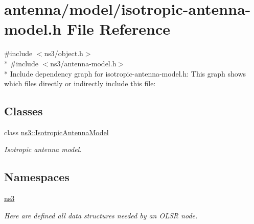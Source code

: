 \hypertarget{isotropic-antenna-model_8h}{}\section{antenna/model/isotropic-\/antenna-\/model.h File Reference}
\label{isotropic-antenna-model_8h}
{\ttfamily \#include $<$ns3/object.\+h$>$}\\*
{\ttfamily \#include $<$ns3/antenna-\/model.\+h$>$}\\*
Include dependency graph for isotropic-\/antenna-\/model.h\+:
This graph shows which files directly or indirectly include this file\+:
\subsection*{Classes}
\begin{DoxyCompactItemize}
\item 
class \hyperlink{classns3_1_1IsotropicAntennaModel}{ns3\+::\+Isotropic\+Antenna\+Model}
\begin{DoxyCompactList}\small\item\em Isotropic antenna model. \end{DoxyCompactList}\end{DoxyCompactItemize}
\subsection*{Namespaces}
\begin{DoxyCompactItemize}
\item 
 \hyperlink{namespacens3}{ns3}
\begin{DoxyCompactList}\small\item\em Here are defined all data structures needed by an O\+L\+SR node. \end{DoxyCompactList}\end{DoxyCompactItemize}
